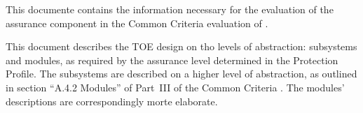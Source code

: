 
This documente contains the information necessary for the evaluation of the
assurance component  in the Common Criteria evaluation of
\thisproductlong{}.

This document describes the TOE design on tho levels of abstraction: subsystems
and modules, as required by the assurance level  determined
in the Protection Profile. The subsystems are described on a higher level of
abstraction, as outlined in section ``A.4.2 Modules'' of Part~III of the Common
Criteria \cite{CCPart3}. The modules' descriptions are correspondingly morte
elaborate.




